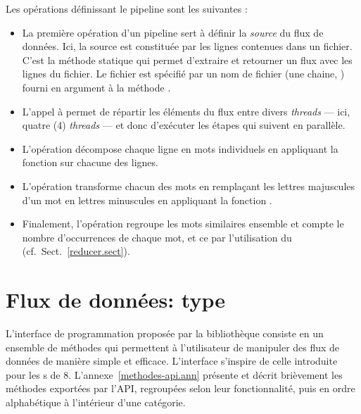 \goodbreak
Les op\'erations d\'efinissant le pipeline sont les suivantes :
\begin{itemize}

\item  La premi\`ere op\'eration d'un pipeline sert \`a d\'efinir la \emph{source} du flux de donn\'ees. Ici, la source est
constitu\'ee par les lignes contenues dans un fichier. C'est la
m\'ethode statique  qui permet d'extraire et retourner un
flux avec les lignes du fichier. Le fichier est sp\'ecifi\'e par un nom de fichier
(une chaine, ) fourni en argument \`a la m\'ethode
.


\item L'appel \`a  permet de r\'epartir les \'el\'ements du flux entre divers \emph{threads} --- ici, quatre (4) \emph{threads} --- et donc d'ex\'ecuter les \'etapes qui suivent en parall\`ele. 



\item L'op\'eration  d\'ecompose chaque ligne en mots individuels en appliquant la fonction  sur chacune des lignes.

\item L'op\'eration  transforme chacun des mots en rempla\c{c}ant les lettres majuscules d'un mot en lettres minuscules en appliquant la fonction .

\item Finalement, l'op\'eration   regroupe les mots similaires ensemble et compte le nombre d'occurrences de chaque mot, et ce par l'utilisation du  (cf.~Sect.~\ref{reducer.sect}).
\end{itemize}


\section{Flux de donn\'ees: type }
\label{flow.sect}

L'interface de programmation propos\'ee par la bibliothèque  consiste en un ensemble de m\'ethodes qui permettent \`a l'utilisateur de manipuler des flux de donn\'ees de mani\`ere simple et efficace. L'interface s'inspire de celle introduite pour les s de  8. L'annexe~\ref{methodes-api.ann} présente et d\'ecrit bri\`evement les m\'ethodes export\'ees par l'API, regroup\'ees selon leur fonctionnalit\'e, puis en ordre alphab\'etique \`a l'int\'erieur d'une cat\'egorie.



